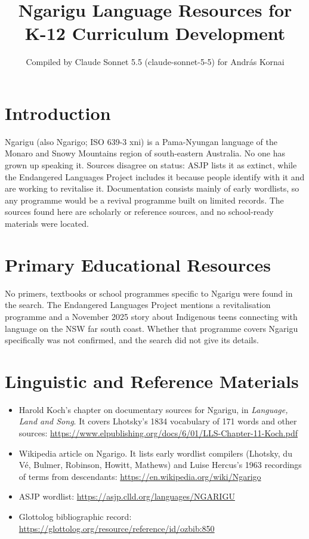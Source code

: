 \documentclass[12pt]{article}
\title{Ngarigu Language Resources for K-12 Curriculum Development}
\author{Compiled by Claude Sonnet 5.5 (claude-sonnet-5-5) for Andr\'as Kornai}
\date{}
\begin{document}
\maketitle

\section{Introduction}
Ngarigu (also Ngarigo; ISO 639-3 xni) is a Pama-Nyungan language of the Monaro and Snowy Mountains region of south-eastern Australia. No one has grown up speaking it. Sources disagree on status: ASJP lists it as extinct, while the Endangered Languages Project includes it because people identify with it and are working to revitalise it. Documentation consists mainly of early wordlists, so any programme would be a revival programme built on limited records. The sources found here are scholarly or reference sources, and no school-ready materials were located.

\section{Primary Educational Resources}
No primers, textbooks or school programmes specific to Ngarigu were found in the search. The Endangered Languages Project mentions a revitalisation programme and a November 2025 story about Indigenous teens connecting with language on the NSW far south coast. Whether that programme covers Ngarigu specifically was not confirmed, and the search did not give its details.

\section{Linguistic and Reference Materials}
\begin{itemize}
\item Harold Koch's chapter on documentary sources for Ngarigu, in \emph{Language, Land and Song}. It covers Lhotsky's 1834 vocabulary of 171 words and other sources: \url{https://www.elpublishing.org/docs/6/01/LLS-Chapter-11-Koch.pdf}
\item Wikipedia article on Ngarigo. It lists early wordlist compilers (Lhotsky, du V\'e, Bulmer, Robinson, Howitt, Mathews) and Luise Hercus's 1963 recordings of terms from descendants: \url{https://en.wikipedia.org/wiki/Ngarigo}
\item ASJP wordlist: \url{https://asjp.clld.org/languages/NGARIGU}
\item Glottolog bibliographic record: \url{https://glottolog.org/resource/reference/id/ozbib:850}
\end{itemize}
\end{document}
